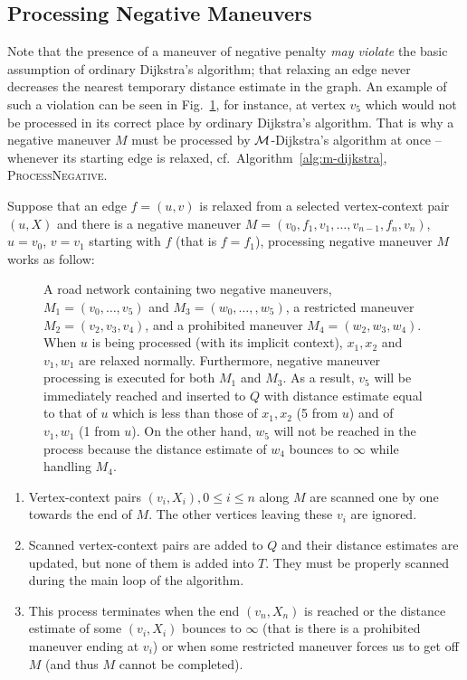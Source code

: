 \documentclass[envcountsect,envcountsame]{llncs}
\begin{document}
\subsection{Processing Negative Maneuvers} 
\label{sec:process_negative_maneuvers}

Note that the presence of a maneuver of negative penalty
{\em may violate} the basic assumption of ordinary Dijkstra's algorithm;
that relaxing an edge never decreases the nearest temporary distance
estimate in the graph. An example of such a violation can be seen in
Fig.~\ref{fig:negative-maneuver}, for instance, at vertex $v_5$ which would 
not be processed in its correct place by ordinary Dijkstra's algorithm.
That is why a negative maneuver $M$ must be processed by $\cal{M}$-Dijkstra's 
algorithm at once -- whenever its starting edge is relaxed, 
cf.~Algorithm~\ref{alg:m-dijkstra}, \textsc{ProcessNegative}.

Suppose that an edge $f=(u,v)$ is relaxed from a selected vertex-context pair 
$(u,X)$ and there is a negative maneuver $M = (v_0,f_1,v_1,\ldots,v_{n-1},f_n,
v_n)$, $u=v_0$, $v=v_1$ starting with $f$ (that is $f=f_1$), processing negative
maneuver $M$ works as follow:

\begin{figure}[t]
  \centering
  \centerline{}
  \caption{A road network containing two negative maneuvers,
    $M_1=(v_0,\ldots,v_5)$ and $M_3=(w_0,\ldots,,w_5)$,
    a restricted maneuver $M_2=(v_2,v_3,v_4)$, and a prohibited 
    maneuver $M_4=(w_2,w_3,w_4)$.
    When $u$ is being processed (with its implicit context),
    $x_1,x_2$ and $v_1,w_1$ are relaxed normally. Furthermore,
    negative maneuver processing is executed for both $M_1$ and $M_3$.
    As a result, $v_5$ will be immediately reached and inserted to $Q$ with
    distance estimate equal to that of $u$ which is less than those of $x_1,
    x_2$ (5 from $u$) and of $v_1,w_1$ (1 from $u$). On the other hand,
    $w_5$ will not be reached in the process because the distance estimate 
    of $w_4$ bounces to $\infty$ while handling $M_4$.}
  \label{fig:negative-maneuver}
\end{figure}

\begin{enumerate}
\parskip 2pt
\item Vertex-context pairs $(v_i,X_i), 0 \le i \le n$ along $M$ are 
  scanned one by one towards the end of $M$. The other vertices leaving 
  these $v_i$ are ignored.

\item Scanned vertex-context pairs are added to $Q$ and their distance 
  estimates are updated, but none of them is added into $T$. They must be 
  properly scanned during the main loop of the algorithm.

\item This process terminates when the end $(v_n,X_n)$ is reached or the 
  distance estimate of some $(v_i,X_i)$ bounces to $\infty$ (that is there is a 
  prohibited maneuver ending at $v_i$) or when some restricted maneuver 
  forces us to get off $M$ (and thus $M$ cannot be completed).
\end{enumerate}
\end{document}
